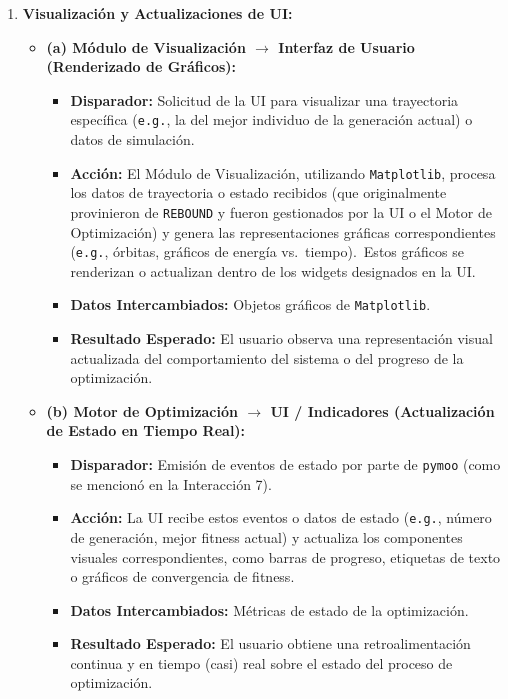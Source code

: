 \begin{enumerate}
    \item \textbf{Visualización y Actualizaciones de UI:}
    \begin{itemize}
        \item \textbf{(a) Módulo de Visualización $\rightarrow$ Interfaz de Usuario (Renderizado de Gráficos):}
            \begin{itemize}
                \item \textbf{Disparador:} Solicitud de la UI para visualizar una trayectoria específica (\texttt{e.g.}, la del mejor individuo de la generación actual) o datos de simulación.
                \item \textbf{Acción:} El Módulo de Visualización, utilizando \texttt{Matplotlib}, procesa los datos de trayectoria o estado recibidos (que originalmente provinieron de \texttt{REBOUND} y fueron gestionados por la UI o el Motor de Optimización) y genera las representaciones gráficas correspondientes (\texttt{e.g.}, órbitas, gráficos de energía vs.\ tiempo).\ Estos gráficos se renderizan o actualizan dentro de los widgets designados en la UI.\
                \item \textbf{Datos Intercambiados:} Objetos gráficos de \texttt{Matplotlib}.
                \item \textbf{Resultado Esperado:} El usuario observa una representación visual actualizada del comportamiento del sistema o del progreso de la optimización.
            \end{itemize}
        \item \textbf{(b) Motor de Optimización $\rightarrow$ UI / Indicadores (Actualización de Estado en Tiempo Real):}
            \begin{itemize}
                \item \textbf{Disparador:} Emisión de eventos de estado por parte de \texttt{pymoo} (como se mencionó en la Interacción 7).
                \item \textbf{Acción:} La UI recibe estos eventos o datos de estado (\texttt{e.g.}, número de generación, mejor fitness actual) y actualiza los componentes visuales correspondientes, como barras de progreso, etiquetas de texto o gráficos de convergencia de fitness.
                \item \textbf{Datos Intercambiados:} Métricas de estado de la optimización.
                \item \textbf{Resultado Esperado:} El usuario obtiene una retroalimentación continua y en tiempo (casi) real sobre el estado del proceso de optimización.
            \end{itemize}
    \end{itemize}
\end{enumerate}


